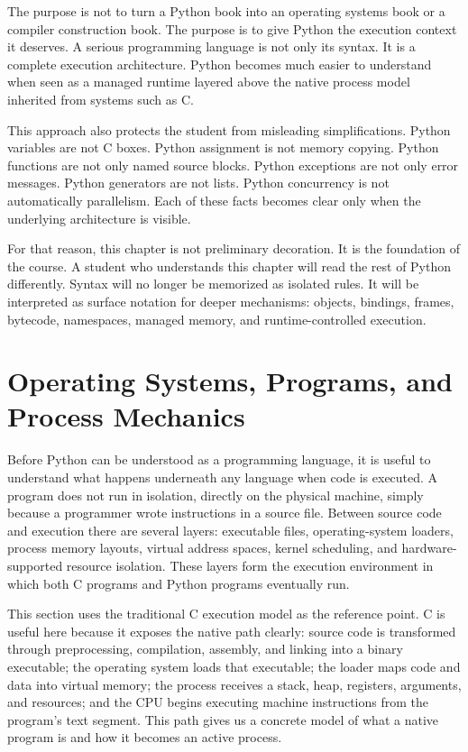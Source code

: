 \documentclass[a4paper,twoside]{report}
\begin{document}
The purpose is not to turn a Python book into an operating systems book or a compiler construction book. The purpose is to give Python the execution context it deserves. A serious programming language is not only its syntax. It is a complete execution architecture. Python becomes much easier to understand when seen as a managed runtime layered above the native process model inherited from systems such as C.

This approach also protects the student from misleading simplifications. Python variables are not C boxes. Python assignment is not memory copying. Python functions are not only named source blocks. Python exceptions are not only error messages. Python generators are not lists. Python concurrency is not automatically parallelism. Each of these facts becomes clear only when the underlying architecture is visible.

For that reason, this chapter is not preliminary decoration. It is the foundation of the course. A student who understands this chapter will read the rest of Python differently. Syntax will no longer be memorized as isolated rules. It will be interpreted as surface notation for deeper mechanisms: objects, bindings, frames, bytecode, namespaces, managed memory, and runtime-controlled execution.

\section{Operating Systems, Programs, and Process Mechanics}

Before Python can be understood as a programming language, it is useful to understand what happens underneath any language when code is executed. A program does not run in isolation, directly on the physical machine, simply because a programmer wrote instructions in a source file. Between source code and execution there are several layers: executable files, operating-system loaders, process memory layouts, virtual address spaces, kernel scheduling, and hardware-supported resource isolation. These layers form the execution environment in which both C programs and Python programs eventually run.

This section uses the traditional C execution model as the reference point. C is useful here because it exposes the native path clearly: source code is transformed through preprocessing, compilation, assembly, and linking into a binary executable; the operating system loads that executable; the loader maps code and data into virtual memory; the process receives a stack, heap, registers, arguments, and resources; and the CPU begins executing machine instructions from the program's text segment. This path gives us a concrete model of what a native program is and how it becomes an active process.
\end{document}

